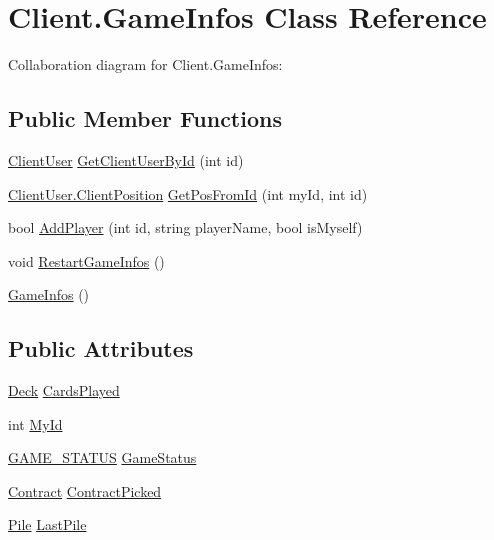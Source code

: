 \hypertarget{class_client_1_1_game_infos}{}\section{Client.\+Game\+Infos Class Reference}
\label{class_client_1_1_game_infos}


Collaboration diagram for Client.\+Game\+Infos\+:
\subsection*{Public Member Functions}
\begin{DoxyCompactItemize}
\item 
\hyperlink{class_client_1_1_client_user}{Client\+User} \hyperlink{class_client_1_1_game_infos_a2dbb92b8c2238fd07e326ffd31b3fd1e}{Get\+Client\+User\+By\+Id} (int id)
\item 
\hyperlink{class_client_1_1_client_user_a346cb93cba9cd67a4de7410a02828cc7}{Client\+User.\+Client\+Position} \hyperlink{class_client_1_1_game_infos_aaa76a248bde67bb6bd73e36b9b57615f}{Get\+Pos\+From\+Id} (int my\+Id, int id)
\item 
bool \hyperlink{class_client_1_1_game_infos_adea137b31b6477e2c64a083e8eab6fac}{Add\+Player} (int id, string player\+Name, bool is\+Myself)
\item 
void \hyperlink{class_client_1_1_game_infos_a2b9f1fda5fe14c3f6509a0fcd640577a}{Restart\+Game\+Infos} ()
\item 
\hyperlink{class_client_1_1_game_infos_afc867ab95ff782307639ead71b2b109a}{Game\+Infos} ()
\end{DoxyCompactItemize}
\subsection*{Public Attributes}
\begin{DoxyCompactItemize}
\item 
\hyperlink{class_game_1_1_deck}{Deck} \hyperlink{class_client_1_1_game_infos_a00af5f50e9e390863429f7d92f6773f6}{Cards\+Played}
\item 
int \hyperlink{class_client_1_1_game_infos_a2c299a5f0e89e0e7488aa5e29734563b}{My\+Id}
\item 
\hyperlink{namespace_server_a2b496a25969b5c46d373f7079fac645f}{G\+A\+M\+E\+\_\+\+S\+T\+A\+T\+US} \hyperlink{class_client_1_1_game_infos_a0575b18e5cac61c7f5c23d1aec491f7f}{Game\+Status}
\item 
\hyperlink{class_game_1_1_contract}{Contract} \hyperlink{class_client_1_1_game_infos_a2a529958f54314f5cda3688858bf3f26}{Contract\+Picked}
\item 
\hyperlink{class_game_1_1_pile}{Pile} \hyperlink{class_client_1_1_game_infos_a59c87f768e5324e97379e687c2570bf5}{Last\+Pile}
\end{DoxyCompactItemize}
